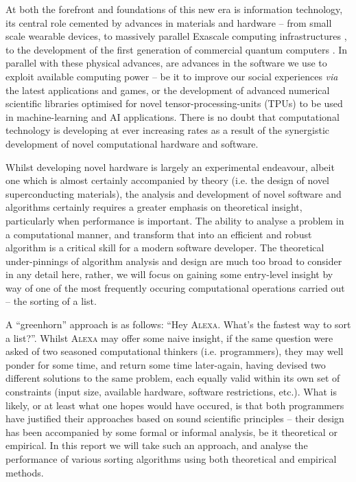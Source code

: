 \documentclass[12pt,a4paper]{article}
\begin{document}
At both the forefront and foundations of this new era is information technology, its central role cemented by advances in materials and hardware -- from small scale wearable devices, to massively parallel Exascale computing infrastructures \cite{aurora}, to the development of the first generation of commercial quantum computers \cite{ibm}. In parallel with these physical advances, are advances in the software we use to exploit available computing power -- be it to improve our social experiences \emph{via} the latest applications and games, or the development of advanced numerical scientific libraries optimised for novel tensor-processing-units (TPUs) \cite{tpu} to be used in machine-learning and AI applications. There is no doubt that computational technology is developing at ever increasing rates as a result of the synergistic development of novel computational hardware and software.

Whilst developing novel hardware is largely an experimental endeavour, albeit one which is almost certainly accompanied by theory (i.e. the design of novel superconducting materials), the analysis and development of novel software and algorithms certainly requires a greater emphasis on theoretical insight, particularly when performance is important. The ability to analyse a problem in a computational manner, and transform that into an efficient and robust algorithm is a critical skill for a modern software developer. The theoretical under-pinnings of algorithm analysis and design are much too broad to consider in any detail here, rather, we will focus on gaining some entry-level insight by way of one of the most frequently occuring computational operations carried out -- the sorting of a list.

A ``greenhorn'' approach is as follows: ``Hey \textsc{Alexa}. What's the fastest way to sort a list?''. Whilst \textsc{Alexa} may offer some naive insight, if the same question were asked of two seasoned computational thinkers (i.e. programmers), they may well ponder for some time, and return some time later-again, having devised two different solutions to the same problem, each equally valid within its own set of constraints (input size, available hardware, software restrictions, etc.). What is likely, or at least what one hopes would have occured, is that both programmers have justified their approaches based on sound scientific principles -- their design has been accompanied by some formal or informal analysis, be it theoretical or empirical. In this report we will take such an approach, and analyse the performance of various sorting algorithms using both theoretical and empirical methods.
\end{document}
